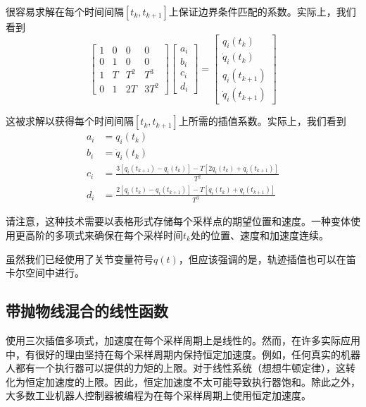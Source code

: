 \documentclass[UTF8]{ctexart}
\theoremstyle{definition}
\begin{document}
很容易求解在每个时间间隔$[t_k, t_{k+1}]$上保证边界条件匹配的系数。实际上，我们看到
\begin{equation}\label{eq:4.2.6}
    \begin{bmatrix} 1 & 0 & 0 & 0 \\ 0 & 1 & 0 & 0 \\ 1 & T & T^2 & T^3 \\ 0 & 1 & 2T & 3T^2 \end{bmatrix} \begin{bmatrix} a_i \\ b_i \\ c_i \\ d_i \end{bmatrix} = \begin{bmatrix} q_i(t_k) \\ \dot{q}_i(t_k) \\ q_i(t_{k+1}) \\ \dot{q}_i(t_{k+1}) \end{bmatrix}
\end{equation}

这被求解以获得每个时间间隔$[t_k, t_{k+1}]$上所需的插值系数。实际上，我们看到
\begin{equation}\label{eq:4.2.7}
\begin{aligned}
    a_i &= q_i(t_k) \\
    b_i &= \dot{q}_i(t_k) \\
    c_i &= \frac{3[q_i(t_{k+1}) - q_i(t_k)] - T[2\dot{q}_i(t_k) + \dot{q}_i(t_{k+1})]}{T^2} \\
    d_i &= \frac{2[q_i(t_k) - q_i(t_{k+1})] - T[\dot{q}_i(t_k) + \dot{q}_i(t_{k+1})]}{T^3}
\end{aligned}
\end{equation}

请注意，这种技术需要以表格形式存储每个采样点的期望位置和速度。一种变体使用更高阶的多项式来确保在每个采样时间$t_k$处的位置、速度和加速度连续。

虽然我们已经使用了关节变量符号$q(t)$，但应该强调的是，轨迹插值也可以在笛卡尔空间中进行。

\subsection{带抛物线混合的线性函数}

使用三次插值多项式，加速度在每个采样周期上是线性的。然而，在许多实际应用中，有很好的理由坚持在每个采样周期内保持恒定加速度。例如，任何真实的机器人都有一个执行器可以提供的力矩的上限。对于线性系统（想想牛顿定律），这转化为恒定加速度的上限。因此，恒定加速度不太可能导致执行器饱和。除此之外，大多数工业机器人控制器被编程为在每个采样周期上使用恒定加速度。
\end{document}
